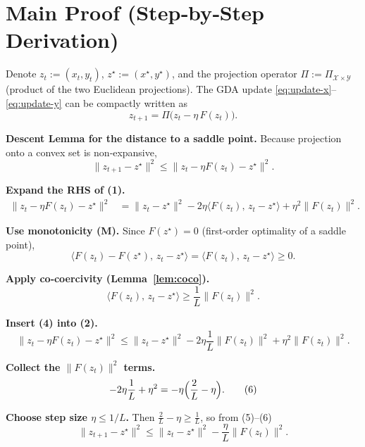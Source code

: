 \documentclass{article}
\begin{document}
\section*{Main Proof (Step‑by‑Step Derivation)}\label{sec:proof}
Denote $z_{t}:=(x_{t},y_{t})$, $z^{\star}:=(x^{\star},y^{\star})$, and the projection operator $\Pi:=\Pi_{\mathcal{X}\times\mathcal{Y}}$ (product of the two Euclidean projections).  
The GDA update \eqref{eq:update-x}–\eqref{eq:update-y} can be compactly written as
\[
z_{t+1}= \Pi\!\bigl(z_{t} - \eta\,F(z_{t})\bigr). \tag{U}
\]

\begin{enumerate}[label=\textbf{[Step \arabic*]}]
\item \textbf{Descent Lemma for the distance to a saddle point.}  
Because projection onto a convex set is non‑expansive,
\[
\|z_{t+1}-z^{\star}\|^{2}
\le \|z_{t}-\eta F(z_{t})-z^{\star}\|^{2}. \tag{1}
\]

\item \textbf{Expand the RHS of (1).}
\begin{align*}
\|z_{t}-\eta F(z_{t})-z^{\star}\|^{2}
&= \|z_{t}-z^{\star}\|^{2}
-2\eta\langle F(z_{t}),\,z_{t}-z^{\star}\rangle
+\eta^{2}\|F(z_{t})\|^{2}. \tag{2}
\end{align*}

\item \textbf{Use monotonicity (M).}  
Since $F(z^{\star})=0$ (first‑order optimality of a saddle point),
\[
\langle F(z_{t})-F(z^{\star}),\,z_{t}-z^{\star}\rangle
= \langle F(z_{t}),\,z_{t}-z^{\star}\rangle \ge 0. \tag{3}
\]

\item \textbf{Apply co‑coercivity (Lemma~\ref{lem:coco}).}
\[
\langle F(z_{t}),\,z_{t}-z^{\star}\rangle
\ge \frac{1}{L}\|F(z_{t})\|^{2}. \tag{4}
\]

\item \textbf{Insert (4) into (2).}
\[
\|z_{t}-\eta F(z_{t})-z^{\star}\|^{2}
\le \|z_{t}-z^{\star}\|^{2}
-2\eta\frac{1}{L}\|F(z_{t})\|^{2}
+\eta^{2}\|F(z_{t})\|^{2}. \tag{5}
\]

\item \textbf{Collect the $\|F(z_{t})\|^{2}$ terms.}
\[
-2\eta\frac{1}{L}+\eta^{2}
= -\eta\Bigl(\frac{2}{L}-\eta\Bigr). \tag{6}
\]

\item \textbf{Choose step size $\eta\le 1/L$.}  
Then $\frac{2}{L}-\eta\ge \frac{1}{L}$, so from (5)–(6)
\[
\|z_{t+1}-z^{\star}\|^{2}
\le \|z_{t}-z^{\star}\|^{2}
-\frac{\eta}{L}\|F(z_{t})\|^{2}. \tag{7}
\]


\end{enumerate}
\end{document}
